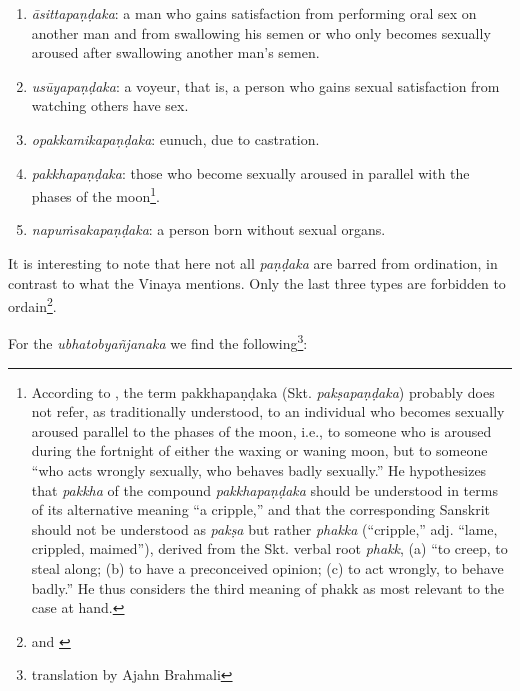 \begin{enumerate}
\item {\em āsittapaṇḍaka}: a man who gains satisfaction from performing oral sex on another man and from swallowing his semen or who only becomes sexually aroused after swallowing another man’s semen. 
\item {\em usūyapaṇḍaka}: a voyeur, that is, a person who gains sexual satisfaction from watching others have sex. 
\item {\em opakkamikapaṇḍaka}: eunuch, due to castration.
\item {\em pakkhapaṇḍaka}: those who become sexually aroused in parallel with the phases of the moon\footnote{According to \cite{bomhard}, the term pakkhapaṇḍaka (Skt. {\em pakṣapaṇḍaka}) probably does not refer, as traditionally understood, to an individual who becomes sexually aroused parallel to the phases of the moon, i.e., to someone who is aroused during the fortnight of either the waxing or waning moon, but to someone “who acts wrongly sexually, who behaves badly sexually.” He hypothesizes that {\em pakkha} of the compound {\em pakkhapaṇḍaka} should be understood in terms of its alternative meaning “a cripple,” and that the corresponding Sanskrit should not be understood as {\em pakṣa} but rather {\em phakka} (“cripple,” adj. “lame, crippled, maimed”), derived from the Skt. verbal root {\em phakk}, (a) “to creep, to steal along; (b) to have a preconceived opinion; (c) to act wrongly, to behave badly.” He thus considers the third meaning of phakk as most relevant to the case at hand.}.
\item {\em napuṁsakapaṇḍaka}: a person born without sexual organs. 
\end{enumerate}

It is interesting to note that here not all {\em paṇḍaka} are barred from ordination, in contrast to what the Vinaya mentions. Only the last three types are forbidden to ordain\footnote{\cite{wong} and \cite{thanissaro}}.

For the {\em ubhatob­yañ­janaka} we find the following\footnote{translation by Ajahn Brahmali}:

